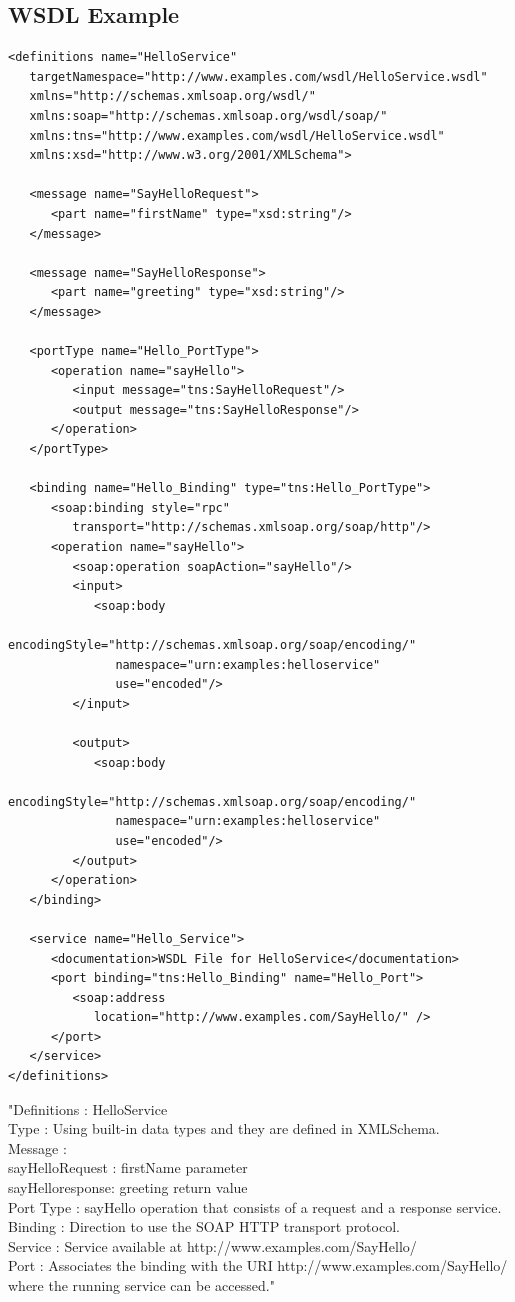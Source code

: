 \documentclass[12pt]{article}
\begin{document}
\subsection{WSDL Example}
\label{sec:wsdlexample}
\begin{lstlisting}
<definitions name="HelloService"
   targetNamespace="http://www.examples.com/wsdl/HelloService.wsdl"
   xmlns="http://schemas.xmlsoap.org/wsdl/"
   xmlns:soap="http://schemas.xmlsoap.org/wsdl/soap/"
   xmlns:tns="http://www.examples.com/wsdl/HelloService.wsdl"
   xmlns:xsd="http://www.w3.org/2001/XMLSchema">
 
   <message name="SayHelloRequest">
      <part name="firstName" type="xsd:string"/>
   </message>
	
   <message name="SayHelloResponse">
      <part name="greeting" type="xsd:string"/>
   </message>

   <portType name="Hello_PortType">
      <operation name="sayHello">
         <input message="tns:SayHelloRequest"/>
         <output message="tns:SayHelloResponse"/>
      </operation>
   </portType>

   <binding name="Hello_Binding" type="tns:Hello_PortType">
      <soap:binding style="rpc"
         transport="http://schemas.xmlsoap.org/soap/http"/>
      <operation name="sayHello">
         <soap:operation soapAction="sayHello"/>
         <input>
            <soap:body
               encodingStyle="http://schemas.xmlsoap.org/soap/encoding/"
               namespace="urn:examples:helloservice"
               use="encoded"/>
         </input>
		
         <output>
            <soap:body
               encodingStyle="http://schemas.xmlsoap.org/soap/encoding/"
               namespace="urn:examples:helloservice"
               use="encoded"/>
         </output>
      </operation>
   </binding>

   <service name="Hello_Service">
      <documentation>WSDL File for HelloService</documentation>
      <port binding="tns:Hello_Binding" name="Hello_Port">
         <soap:address
            location="http://www.examples.com/SayHello/" />
      </port>
   </service>
</definitions>
\end{lstlisting}
"Definitions : HelloService \\
Type : Using built-in data types and they are defined in XMLSchema. \\
Message :\\
    sayHelloRequest : firstName parameter\\
    sayHelloresponse: greeting return value\\
Port Type : sayHello operation that consists of a request and a response service.\\
Binding : Direction to use the SOAP HTTP transport protocol.\\
Service : Service available at http://www.examples.com/SayHello/\\
Port : Associates the binding with the URI http://www.examples.com/SayHello/ where 
the running service can be accessed."\cite{wsdl}
\end{document}
